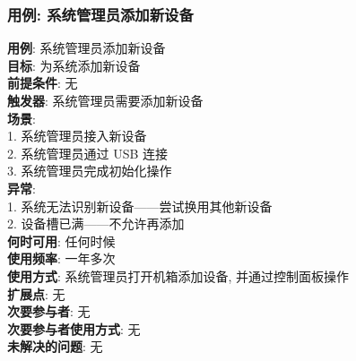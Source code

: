 \documentclass[UTF8]{article}
\begin{document}
\subsubsection{用例: 系统管理员添加新设备}
\noindent
\textbf{用例}: 系统管理员添加新设备
\\
\textbf{目标}: 为系统添加新设备
\\
\textbf{前提条件}: 无
\\
\textbf{触发器}: 系统管理员需要添加新设备
\\
\textbf{场景}: \\
	\hspace*{2em} 1. 系统管理员接入新设备 \\
	\hspace*{2em} 2. 系统管理员通过 USB 连接 \\
	\hspace*{2em} 3. 系统管理员完成初始化操作 \\
\textbf{异常}: \\
	\hspace*{2em} 1. 系统无法识别新设备——尝试换用其他新设备 \\
	\hspace*{2em} 2. 设备槽已满——不允许再添加 \\
\textbf{何时可用}: 任何时候 \\
\textbf{使用频率}: 一年多次 \\
\textbf{使用方式}: 系统管理员打开机箱添加设备, 并通过控制面板操作 \\
\textbf{扩展点}: 无 \\
\textbf{次要参与者}: 无 \\
\textbf{次要参与者使用方式}: 无 \\
\textbf{未解决的问题}: 无 \\
	
\end{document}
